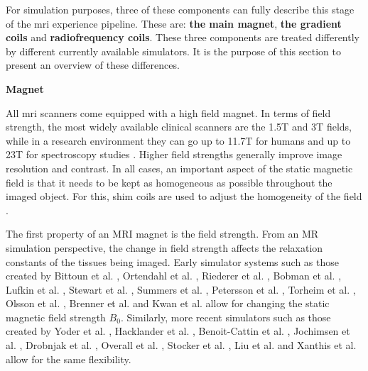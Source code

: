 \hfill

For simulation purposes, three of these components can fully describe this stage of the \ac{mri} experience pipeline.
These are: \textbf{the main magnet}, \textbf{the gradient coils} and \textbf{radiofrequency coils}.
These three components are treated differently by different currently available simulators.
It is the purpose of this section to present an overview of these differences.

\hfill

\large \textbf{Magnet} \normalsize

All \ac{mri} scanners come equipped with a high field magnet.
In terms of field strength, the most widely available clinical scanners are the 1.5T and 3T fields, while in a research environment they can go up to 11.7T for humans and up to 23T for spectroscopy studies \cite{Morrow2000}.
Higher field strengths generally improve image resolution and contrast.
In all cases, an important aspect of the static magnetic field is that it needs to be kept as homogeneous as possible throughout the imaged object.
For this, shim coils are used to adjust the homogeneity of the field \cite{Romeo1984}.

\hfill

The first property of an MRI magnet is the field strength. 
From an MR simulation perspective, the change in field strength affects the relaxation constants of the tissues being imaged.
Early simulator systems such as those created by
Bittoun et al. \cite{Bittoun1984},
Ortendahl et al. \cite{Ortendahl1984},
Riederer et al. \cite{Riederer1984},
Bobman et al. \cite{Bobman1985},
Lufkin et al. \cite{Lufkin1986},
Stewart et al. \cite{Stewart1986},
Summers et al. \cite{Summers1986},
Petersson et al. \cite{Petersson1993},
Torheim et al. \cite{Torheim1994}, 
Olsson et al. \cite{Olsson1995},
Brenner et al. \cite{Brenner1997} and
Kwan et al. \cite{Kwan1997} allow for changing the static magnetic field strength $B_0$.
Similarly, more recent simulators such as those created by
Yoder et al. \cite{Yoder2004},
Hacklander et al. \cite{Hacklander2005},
Benoit-Cattin et al. \cite{Benoit-Cattin2005},
Jochimsen et al. \cite{Jochimsen2004},
Drobnjak et al. \cite{Drobnjak2006},
Overall et al. \cite{Overall2007},
Stocker et al. \cite{Stocker2010},
Liu et al. \cite{Liu2013} and 
Xanthis et al. \cite{Xanthis2014} allow for the same flexibility.

